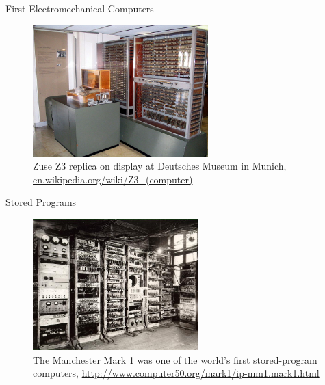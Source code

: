 \documentclass[xcolor=x11names,compress]{beamer}
\renewcommand{\(}{\begin{columns}}
\renewcommand{\)}{\end{columns}}
\newcommand{\<}[1]{\begin{column}{#1}}
\renewcommand{\>}{\end{column}}
\begin{document}
\begin{frame}{First Electromechanical Computers}

\begin{figure}
\includegraphics[height=2in,clip]{Z3DeutschesMuseum}
\caption{Zuse Z3 replica on display at Deutsches Museum in Munich, \href{en.wikipedia.org/wiki/Z3_(computer)}{en.wikipedia.org/wiki/Z3\_(computer)}}
\end{figure}

\end{frame}

\begin{frame}{Stored Programs}

\begin{figure}
\includegraphics[height=2in,clip]{ManchesterMark1}
\caption{The Manchester Mark 1 was one of the world's first stored-program computers, \href{http://www.computer50.org/mark1/ip-mm1.mark1.html}{http://www.computer50.org/mark1/ip-mm1.mark1.html}}
\end{figure}

\end{frame}
\end{document}
